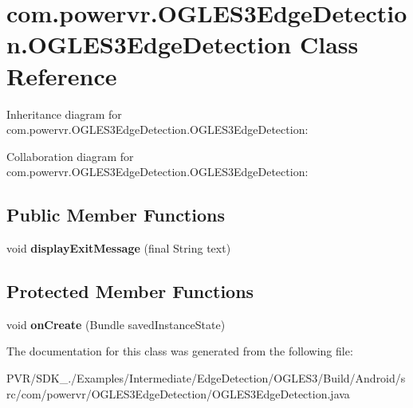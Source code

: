 \hypertarget{classcom_1_1powervr_1_1_o_g_l_e_s3_edge_detection_1_1_o_g_l_e_s3_edge_detection}{\section{com.\+powervr.\+O\+G\+L\+E\+S3\+Edge\+Detection.\+O\+G\+L\+E\+S3\+Edge\+Detection Class Reference}
\label{classcom_1_1powervr_1_1_o_g_l_e_s3_edge_detection_1_1_o_g_l_e_s3_edge_detection}
}


Inheritance diagram for com.\+powervr.\+O\+G\+L\+E\+S3\+Edge\+Detection.\+O\+G\+L\+E\+S3\+Edge\+Detection\+:


Collaboration diagram for com.\+powervr.\+O\+G\+L\+E\+S3\+Edge\+Detection.\+O\+G\+L\+E\+S3\+Edge\+Detection\+:
\subsection*{Public Member Functions}
\begin{DoxyCompactItemize}
\item 
\hypertarget{classcom_1_1powervr_1_1_o_g_l_e_s3_edge_detection_1_1_o_g_l_e_s3_edge_detection_a9cf2c38bc577a0d7a90547f4fcde2f3c}{void {\bfseries display\+Exit\+Message} (final String text)}\label{classcom_1_1powervr_1_1_o_g_l_e_s3_edge_detection_1_1_o_g_l_e_s3_edge_detection_a9cf2c38bc577a0d7a90547f4fcde2f3c}

\end{DoxyCompactItemize}
\subsection*{Protected Member Functions}
\begin{DoxyCompactItemize}
\item 
\hypertarget{classcom_1_1powervr_1_1_o_g_l_e_s3_edge_detection_1_1_o_g_l_e_s3_edge_detection_a1f241083eac7a06945345877aaedb15e}{void {\bfseries on\+Create} (Bundle saved\+Instance\+State)}\label{classcom_1_1powervr_1_1_o_g_l_e_s3_edge_detection_1_1_o_g_l_e_s3_edge_detection_a1f241083eac7a06945345877aaedb15e}

\end{DoxyCompactItemize}


The documentation for this class was generated from the following file\+:\begin{DoxyCompactItemize}
\item 
P\+V\+R/\+S\+D\+K\+\_./\+Examples/\+Intermediate/\+Edge\+Detection/\+O\+G\+L\+E\+S3/\+Build/\+Android/src/com/powervr/\+O\+G\+L\+E\+S3\+Edge\+Detection/O\+G\+L\+E\+S3\+Edge\+Detection.\+java\end{DoxyCompactItemize}
